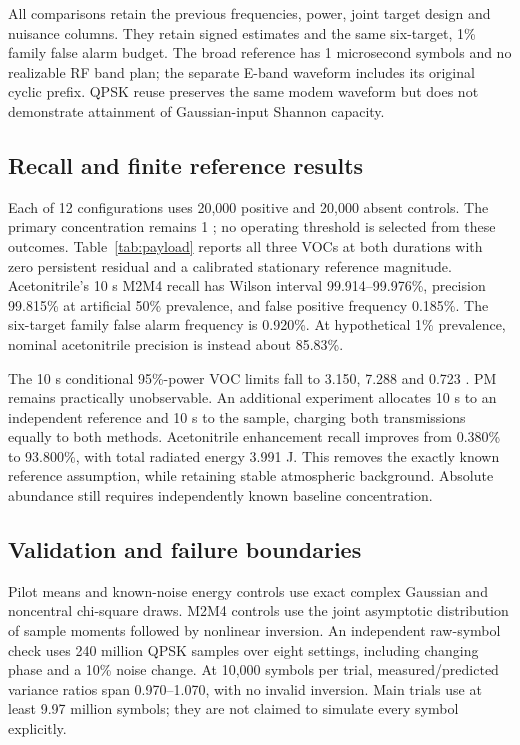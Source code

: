 All comparisons retain the previous frequencies, power, joint target design and nuisance columns. They retain signed estimates and the same six-target, 1\% family false alarm budget. The broad reference has 1 microsecond symbols and no realizable RF band plan; the separate E-band waveform includes its original cyclic prefix. QPSK reuse preserves the same modem waveform but does not demonstrate attainment of Gaussian-input Shannon capacity.

\subsection{Recall and finite reference results}
Each of 12 configurations uses 20,000 positive and 20,000 absent controls. The primary concentration remains 1 \ugm; no operating threshold is selected from these outcomes. Table~\ref{tab:payload} reports all three VOCs at both durations with zero persistent residual and a calibrated stationary reference magnitude. Acetonitrile's 10 s M2M4 recall has Wilson interval 99.914--99.976\%, precision 99.815\% at artificial 50\% prevalence, and false positive frequency 0.185\%. The six-target family false alarm frequency is 0.920\%. At hypothetical 1\% prevalence, nominal acetonitrile precision is instead about 85.83\%.

\begin{table}[t]\centering\footnotesize
\caption{Recall at 1 \ugm\ with the same transmissions. Zero persistent residual, stationary multiband model.}

\label{tab:payload}
\end{table}

The 10 s conditional 95\%-power VOC limits fall to 3.150, 7.288 and 0.723 \ugm. PM remains practically unobservable. An additional experiment allocates 10 s to an independent reference and 10 s to the sample, charging both transmissions equally to both methods. Acetonitrile enhancement recall improves from 0.380\% to 93.800\%, with total radiated energy 3.991 J. This removes the exactly known reference assumption, while retaining stable atmospheric background. Absolute abundance still requires independently known baseline concentration.

\subsection{Validation and failure boundaries}
Pilot means and known-noise energy controls use exact complex Gaussian and noncentral chi-square draws. M2M4 controls use the joint asymptotic distribution of sample moments followed by nonlinear inversion. An independent raw-symbol check uses 240 million QPSK samples over eight settings, including changing phase and a 10\% noise change. At 10,000 symbols per trial, measured/predicted variance ratios span 0.970--1.070, with no invalid inversion. Main trials use at least 9.97 million symbols; they are not claimed to simulate every symbol explicitly.

